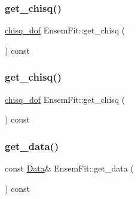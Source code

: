 \subsubsection{\texorpdfstring{get\_chisq()}{get\_chisq()}\hspace{0.1cm}{\footnotesize\ttfamily [1/2]}}
{\footnotesize\ttfamily \mbox{\hyperlink{structchisq__dof}{chisq\+\_\+dof}} Ensem\+Fit\+::get\+\_\+chisq (\begin{DoxyParamCaption}{ }\end{DoxyParamCaption}) const\hspace{0.3cm}{\ttfamily [inline]}}

\mbox{\label{classEnsemFit_a4122f6735d730a4759cc134056b8aa96}} 
\subsubsection{\texorpdfstring{get\_chisq()}{get\_chisq()}\hspace{0.1cm}{\footnotesize\ttfamily [2/2]}}
{\footnotesize\ttfamily \mbox{\hyperlink{structchisq__dof}{chisq\+\_\+dof}} Ensem\+Fit\+::get\+\_\+chisq (\begin{DoxyParamCaption}{ }\end{DoxyParamCaption}) const\hspace{0.3cm}{\ttfamily [inline]}}

\mbox{\label{classEnsemFit_a3015ab1126ad56869931c3ee6e5f054f}} 
\subsubsection{\texorpdfstring{get\_data()}{get\_data()}\hspace{0.1cm}{\footnotesize\ttfamily [1/2]}}
{\footnotesize\ttfamily const \mbox{\hyperlink{classData}{Data}}\& Ensem\+Fit\+::get\+\_\+data (\begin{DoxyParamCaption}{ }\end{DoxyParamCaption}) const\hspace{0.3cm}{\ttfamily [inline]}}


